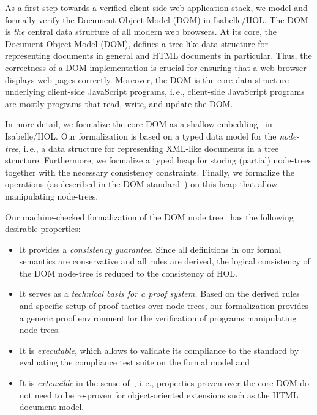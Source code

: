 \documentclass[10pt,DIV16,a4paper,abstract=true,twoside=semi,openright]
{scrreprt}
\newcommand{\ie}{i.\,e.\xspace}
\begin{document}
As a first step towards a verified client-side web application stack,
we model and formally verify the Document Object Model (DOM) in
Isabelle/HOL\@. The DOM~\cite{whatwg:dom:2017,w3c:dom:2015} is
\emph{the} central data structure of all modern web browsers.  At its
core, the Document Object Model (DOM), defines a tree-like data
structure for representing documents in general and HTML documents in
particular. Thus, the correctness of a DOM implementation is crucial
for ensuring that a web browser displays web pages correctly.
Moreover, the DOM is the core data structure underlying client-side
JavaScript programs, \ie, client-side JavaScript programs are mostly
programs that read, write, and update the DOM.

In more detail, we formalize the core DOM as a shallow
embedding~\cite{joyce.ea:higher:1994} in Isabelle/HOL\@. Our
formalization is based on a typed data model for the \emph{node-tree},
\ie, a data structure for representing XML-like documents in a tree
structure. Furthermore, we formalize a typed heap for storing
(partial) node-trees together with the necessary consistency
constraints. Finally, we formalize the operations (as described in the
DOM standard~\cite{whatwg:dom:2017}) on this heap that allow
manipulating node-trees.

Our machine-checked formalization of the DOM node
tree~\cite{whatwg:dom:2017} has the following desirable properties:
\begin{itemize}
\item It provides a \emph{consistency guarantee.} Since all
  definitions in our formal semantics are conservative and all rules
  are derived, the logical consistency of the DOM node-tree is reduced
  to the consistency of HOL.
\item It serves as a \emph{technical basis for a proof system.}  Based
  on the derived rules and specific setup of proof tactics over
  node-trees, our formalization provides a generic proof environment
  for the verification of programs manipulating node-trees.
\item It is \emph{executable}, which allows to validate its compliance
  to the standard by evaluating the compliance test suite on the
  formal model and
\item It is \emph{extensible} in the sense
  of~\cite{brucker.ea:extensible:2008-b,brucker:interactive:2007},
  \ie, properties proven over the core DOM do not need to be re-proven
  for object-oriented extensions such as the HTML document model.
\end{itemize}
\end{document}

